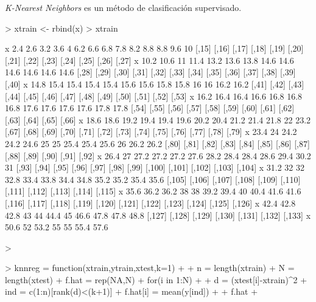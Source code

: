 \documentclass[a4paper,12pt]{article}
\begin{document}
\textit{K-Nearest Neighbors} es un método de clasificación supervisado. 
\begin{Schunk}
\begin{Sinput}
> xtrain <- rbind(x)
> xtrain
\end{Sinput}
\begin{Soutput}
  [,1] [,2] [,3] [,4] [,5] [,6] [,7] [,8] [,9] [,10] [,11] [,12] [,13] [,14]
x  2.4  2.6  3.2  3.6    4  6.2  6.6  6.8  7.8   8.2   8.8   8.8   9.6    10
  [,15] [,16] [,17] [,18] [,19] [,20] [,21] [,22] [,23] [,24] [,25] [,26] [,27]
x  10.2  10.6    11  11.4  13.2  13.6  13.8  14.6  14.6  14.6  14.6  14.6  14.6
  [,28] [,29] [,30] [,31] [,32] [,33] [,34] [,35] [,36] [,37] [,38] [,39] [,40]
x  14.8  15.4  15.4  15.4  15.4  15.6  15.6  15.8  15.8    16    16  16.2  16.2
  [,41] [,42] [,43] [,44] [,45] [,46] [,47] [,48] [,49] [,50] [,51] [,52] [,53]
x  16.2  16.4  16.4  16.6  16.8  16.8  16.8  17.6  17.6  17.6  17.6  17.8  17.8
  [,54] [,55] [,56] [,57] [,58] [,59] [,60] [,61] [,62] [,63] [,64] [,65] [,66]
x  18.6  18.6  19.2  19.4  19.4  19.6  20.2  20.4  21.2  21.4  21.8    22  23.2
  [,67] [,68] [,69] [,70] [,71] [,72] [,73] [,74] [,75] [,76] [,77] [,78] [,79]
x  23.4    24  24.2  24.2  24.6    25    25  25.4  25.4  25.6    26  26.2  26.2
  [,80] [,81] [,82] [,83] [,84] [,85] [,86] [,87] [,88] [,89] [,90] [,91] [,92]
x  26.4    27  27.2  27.2  27.2  27.6  28.2  28.4  28.4  28.6  29.4  30.2    31
  [,93] [,94] [,95] [,96] [,97] [,98] [,99] [,100] [,101] [,102] [,103] [,104]
x  31.2    32    32  32.8  33.4  33.8  34.4   34.8   35.2   35.2   35.4   35.6
  [,105] [,106] [,107] [,108] [,109] [,110] [,111] [,112] [,113] [,114] [,115]
x   35.6   36.2   36.2     38     38   39.2   39.4     40   40.4   41.6   41.6
  [,116] [,117] [,118] [,119] [,120] [,121] [,122] [,123] [,124] [,125] [,126]
x   42.4   42.8   42.8     43     44   44.4     45   46.6   47.8   47.8   48.8
  [,127] [,128] [,129] [,130] [,131] [,132] [,133]
x   50.6     52   53.2     55     55   55.4   57.6
\end{Soutput}
\begin{Sinput}
> 
\end{Sinput}
\end{Schunk}



\begin{Schunk}
\begin{Sinput}
> knnreg = function(xtrain,ytrain,xtest,k=1)
+   {
+     n = length(xtrain)
+     N = length(xtest)
+     f.hat = rep(NA,N)
+     for(i in 1:N)
+       {
+         d = (xtest[i]-xtrain)^2
+         ind = c(1:n)[rank(d)<(k+1)]
+         f.hat[i] = mean(y[ind])
+       }
+     f.hat
+   }
\end{Sinput}
\end{Schunk}
\end{document}
